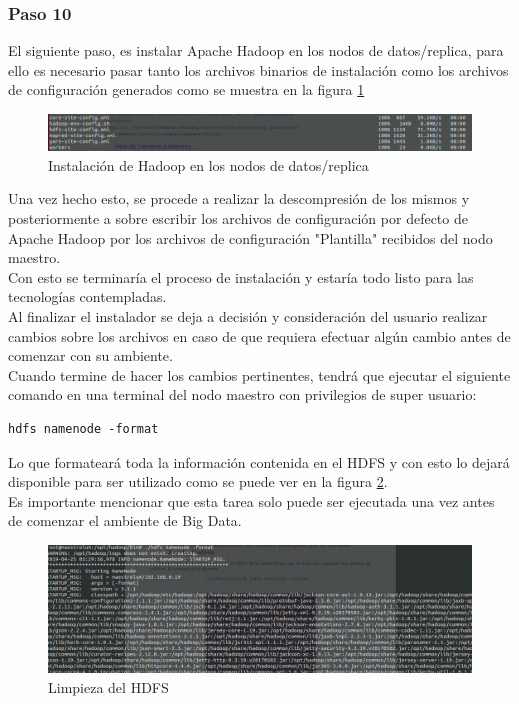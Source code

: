 \subsubsection{Paso 10}
El siguiente paso, es instalar Apache Hadoop en los nodos de datos/replica, para ello es necesario pasar tanto los archivos binarios de instalación como los archivos de configuración generados como se muestra en la figura \ref{fig:pasarhadoop}
\begin{figure}[H]
	\hypertarget{fig:pasarhadoop}{\hspace{1pt}}
	\begin{center}	
		\includegraphics[width=.7\textwidth]{capitulo5/images/configuracionhadoopesclavo.png}
		\caption{Instalación de Hadoop en los nodos de datos/replica}
		\label{fig:pasarhadoop}
	\end{center}
\end{figure}
Una vez hecho esto, se procede a realizar la descompresión de los mismos y posteriormente a sobre escribir los archivos de configuración por defecto de Apache Hadoop por los archivos de configuración "Plantilla" recibidos del nodo maestro.\\
Con esto se terminaría el proceso de instalación y estaría todo listo para las tecnologías contempladas.\\
Al finalizar el instalador se deja a decisión y consideración del usuario realizar cambios sobre los archivos en caso de que requiera efectuar algún cambio antes de comenzar con su ambiente.\\
Cuando termine de hacer los cambios pertinentes, tendrá que ejecutar el siguiente comando en una terminal del nodo maestro con privilegios de super usuario:
\begin{verbatim}
hdfs namenode -format
\end{verbatim}
Lo que formateará toda la información contenida en el HDFS y con esto lo dejará disponible para ser utilizado como se puede ver en la figura \ref{fig:limpieza}.
\\
Es importante mencionar que esta tarea solo puede ser ejecutada una vez antes de comenzar el ambiente de Big Data. 
\begin{figure}[H]
	\hypertarget{fig:limpieza}{\hspace{1pt}}
	\begin{center}	
		\includegraphics[width=.7\textwidth]{capitulo5/images/hadoop.jpeg}
		\caption{Limpieza del HDFS}
		\label{fig:limpieza}
	\end{center}
\end{figure}
